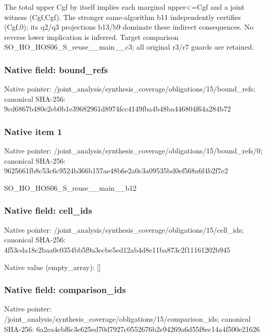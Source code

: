\documentclass[10pt,a4paper]{article}
\begin{document}
\begingroup\raggedright\sloppy The total upper Cgf by itself implies each marginal upper<=\allowbreak{}Cgf and a joint witness (Cgf,\allowbreak{}Cgf). The stronger same-algorithm b11 independently certifies (Cgf,\allowbreak{}0);\allowbreak{} its q2/\allowbreak{}q3 projections b13/\allowbreak{}b9 dominate these indirect consequences. No reverse lower implication is inferred. Target comparison SO\_\allowbreak{}HO\_\allowbreak{}HOS06\_\allowbreak{}S\_\allowbreak{}reuse\_\allowbreak{}\_\allowbreak{}main\_\allowbreak{}\_\allowbreak{}c3;\allowbreak{} all original r3/\allowbreak{}r7 guards are retained.\par\endgroup

\subsubsection{Native field: bound\_\allowbreak{}refs}
Native pointer: /joint\_\allowbreak{}analysis/synthesis\_\allowbreak{}coverage/obligations/15/bound\_\allowbreak{}refs; canonical SHA-256: 9cd6867b480e2eb0b1e39682961d8974fcc4149fba4b48ba446804f64a284b72

\subsubsection{Native item 1}
Native pointer: /joint\_\allowbreak{}analysis/synthesis\_\allowbreak{}coverage/obligations/15/bound\_\allowbreak{}refs/0; canonical SHA-256: 9625661fb8c53c6c9524b366b157ae48b6e2a0c3a09535bd0ef568a6f4b2f7e2

\begingroup\raggedright\sloppy SO\_\allowbreak{}HO\_\allowbreak{}HOS06\_\allowbreak{}S\_\allowbreak{}reuse\_\allowbreak{}\_\allowbreak{}main\_\allowbreak{}\_\allowbreak{}b12\par\endgroup

\subsubsection{Native field: cell\_\allowbreak{}ids}
Native pointer: /joint\_\allowbreak{}analysis/synthesis\_\allowbreak{}coverage/obligations/15/cell\_\allowbreak{}ids; canonical SHA-256: 4f53cda18c2baa0c0354bb5f9a3ecbe5ed12ab4d8e11ba873c2f11161202b945

Native value (empty\_\allowbreak{}array): []

\subsubsection{Native field: comparison\_\allowbreak{}ids}
Native pointer: /joint\_\allowbreak{}analysis/synthesis\_\allowbreak{}coverage/obligations/15/comparison\_\allowbreak{}ids; canonical SHA-256: 6a2ea4ebf6c3e625ed70d7927c0552676b2e94269a6d55f8ec14a4f500e21626
\end{document}
